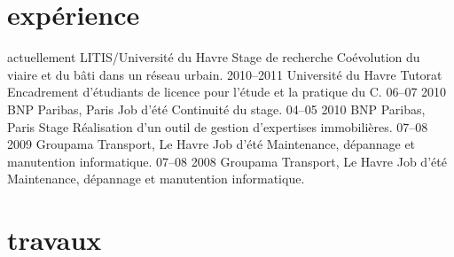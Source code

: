 \documentclass[]{friggeri-cv}
\begin{document}
\section{expérience}

\begin{entrylist}
  \entry
    {actuellement}
    {LITIS/Université du Havre}
    {Stage de recherche}
    {Coévolution du viaire et du bâti dans un réseau urbain.}
  \entry
    {2010–2011}
    {Université du Havre}
    {Tutorat}
    {Encadrement d'étudiants de licence pour l'étude et la pratique du
    C.}
  \entry
    {06–07 2010}
    {BNP Paribas, Paris}
    {Job d'été}
    {Continuité du stage.}
  \entry
    {04–05 2010}
    {BNP Paribas, Paris}
    {Stage}
    {Réalisation d'un outil de gestion d'expertises immobilières.}
  \entry
    {07–08 2009}
    {Groupama Transport, Le Havre}
    {Job d'été}
    {Maintenance, dépannage et manutention informatique.}
  \entry
    {07–08 2008}
    {Groupama Transport, Le Havre}
    {Job d'été}
    {Maintenance, dépannage et manutention informatique.}
\end{entrylist}

\newpage

\section{travaux}
\end{document}
